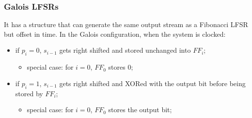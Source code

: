 \newpage
\subsubsection{Galois LFSRs}
It has a structure that can generate the same output stream as a Fibonacci LFSR but offset in time. In the Galois configuration, when the system is clocked:
\begin{itemize}
    \item if $p_i=0$, $s_{i-1}$ gets right shifted and stored unchanged into $FF_i$;
    \begin{itemize}
        \item special case: for $i=0$, $FF_0$ stores 0;
    \end{itemize}
    \item if $p_i=1$, $s_{i-1}$ gets right shifted and XORed with the output bit before being stored by $FF_i$;
    \begin{itemize}
        \item special case: for $i=0$, $FF_0$ stores the output bit;
    \end{itemize}
\end{itemize}
